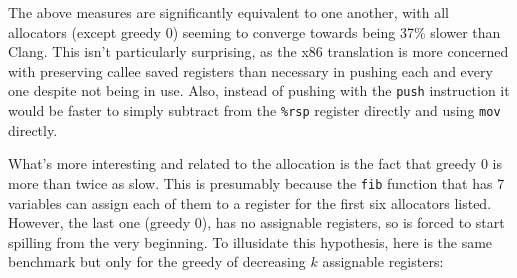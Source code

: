 \documentclass{article}
\begin{document}
The above measures are significantly equivalent to one another, with all allocators (except greedy 0) seeming to converge towards being 37\% slower than Clang. This isn't particularly surprising, as the x86 translation is more concerned with preserving callee saved registers than necessary in pushing each and every one despite not being in use. Also, instead of pushing with the \lstinline!push! instruction it would be faster to simply subtract from the \lstinline!%rsp! register directly and using \lstinline!mov! directly.

What's more interesting and related to the allocation is the fact that greedy 0 is more than twice as slow. This is presumably because the \lstinline!fib! function that has 7 variables can assign each of them to a register for the first six allocators listed. However, the last one (greedy 0), has no assignable registers, so is forced to start spilling from the very beginning. To illusidate this hypothesis, here is the same benchmark but only for the greedy of decreasing \(k\) assignable registers:
\end{document}

